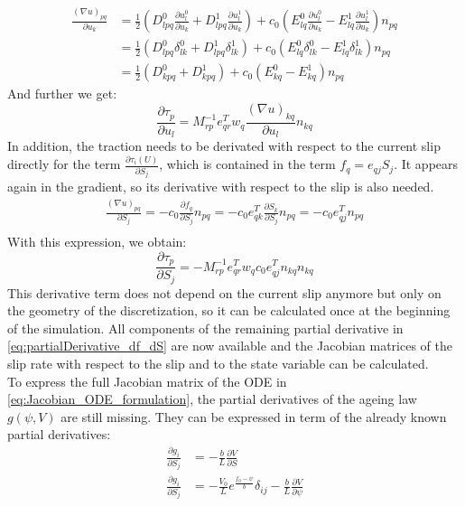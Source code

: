 \begin{align}
\frac{(\nabla u)_{pq}}{\partial u_k} &= \frac{1}{2}\left(D_{lpq}^0\frac{\partial u_l^0}{\partial u_k} + D_{lpq}^1\frac{\partial u_l^1}{\partial u_k}\right) + c_0\left(E_{lq}^0\frac{\partial u_l^0}{\partial u_k} - E_{lq}^1\frac{\partial u_l^1}{\partial u_k}\right)n_{pq} \\
&= \frac{1}{2}\left(D_{lpq}^0\delta_{lk}^0 + D_{lpq}^1\delta_{lk}^1\right) + c_0\left(E_{lq}^0\delta_{lk}^0 - E_{lq}^1\delta_{lk}^1\right)n_{pq} \\
&= \frac{1}{2}\left(D_{kpq}^0 + D_{kpq}^1\right) + c_0\left(E_{kq}^0 - E_{kq}^1\right)n_{pq} 
\end{align}
And further we get: 
\begin{equation}
\frac{\partial \tau_p}{\partial u_l} = M_{rp}^{-1}e_{qr}^Tw_q
\frac{(\nabla u)_{kq}}{\partial u_l}n_{kq}
\end{equation}
In addition, the traction needs to be derivated with respect to the current slip directly for the term $\frac{\partial \tau_i(U)}{\partial S_j}$, which is contained in the term $f_q = e_{qj}S_j$. It appears again in the gradient, so its derivative with respect to the slip is also needed. 
\begin{align}
\frac{(\nabla u)_{pq}}{\partial S_j} = -c_0 \frac{\partial f_q}{\partial S_j}n_{pq} 
= -c_0 e^T_{qk}\frac{\partial S_k}{\partial S_j}n_{pq} 
= -c_0 e^T_{qj}n_{pq} \\	
\end{align}
With this expression, we obtain: 
\begin{equation}
\frac{\partial \tau_p}{\partial S_j} = -M_{rp}^{-1}e_{qr}^Tw_qc_0e^T_{qj}n_{kq}n_{kq}
\end{equation}
This derivative term does not depend on the current slip anymore but only on the geometry of the discretization, so it can be calculated once at the beginning of the simulation. All components of the remaining partial derivative in \autoref{eq:partialDerivative_df_dS} are now available and the Jacobian matrices of the slip rate with respect to the slip and to the state variable can be calculated. \\
To express the full Jacobian matrix of the ODE in \autoref{eq:Jacobian_ODE_formulation}, the partial derivatives of the ageing law $g(\psi, V)$ are still missing. They can be expressed in term of the already known partial derivatives: 
\begin{align}
\frac{\partial g_i}{\partial S_j} &= -\frac{b}{L}\frac{\partial V}{\partial S} \\
\frac{\partial g_i}{\partial S_j} &= -\frac{V_0}{L}e^{\frac{f_0 - \psi}{b}}\delta_{ij} -
\frac{b}{L}\frac{\partial V}{\partial \psi}
\end{align}



